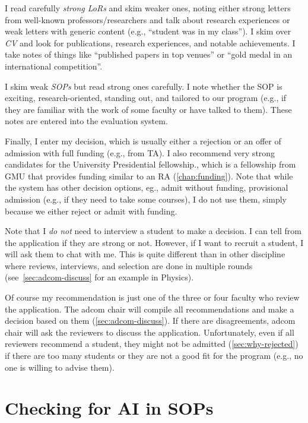 \documentclass[oneside,11pt,dvipsnames]{book}
\begin{document}
I read carefully \emph{strong LoRs} and skim weaker ones, noting either strong letters from well-known professors/researchers and talk about research experiences or weak letters with generic content (e.g., ``student was in my class''). I skim over \emph{CV} and look for publications, research experiences, and notable achievements. I take notes of things like ``published papers in top venues'' or ``gold medal in an international competition''.

I skim weak \emph{SOPs} but read strong ones carefully. I note whether the SOP is exciting, research-oriented, standing out, and tailored to our program (e.g., if they are familiar with the work of some faculty or have talked to them). These notes are entered into the evaluation system.

Finally, I enter my decision, which is usually either a rejection or an offer of admission with full funding (e.g., from TA). I also recommend very strong candidates for the University Presidential fellowship., which is a fellowship from GMU that provides funding similar to an RA (\autoref{chap:funding}).
Note that while the system has other decision options, eg., admit without funding, provisional admission (e.g., if they need to take some courses), I do not use them, simply because we either reject or admit with funding.

Note that I \emph{do not} need to interview a student to make a decision.  I can tell from the application if they are strong or not. However, if I want to recruit a student, I will ask them to chat with me. 
This is quite different than in other discipline where reviews, interviews, and selection are done in multiple rounds (see~\autoref{sec:adcom-discuss} for an example in Physics).

Of course my recommendation is just one of the three or four faculty who review the application.  The adcom chair will compile all recommendations and make a decision based on them (\autoref{sec:adcom-discuss}).
If there are disagreements, adcom chair will ask the reviewers to discuss the application. 
Unfortunately, even if all reviewers recommend a student, they might not be admitted (\autoref{sec:why-rejected}) if there are too many students or they are not a good fit for the program (e.g., no one is willing to advise them).

\section{Checking for AI in SOPs}\label{sec:ai-sop}
\end{document}
